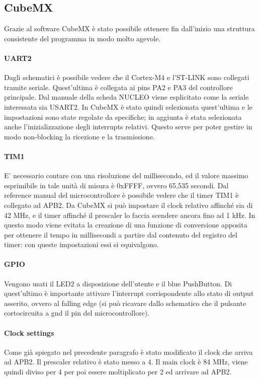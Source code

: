 \documentclass[a4paper]{article}
\begin{document}
	\subsection{CubeMX}
		Grazie al software CubeMX è stato possibile ottenere fin dall'inizio una struttura consistente del programma in modo molto agevole. 
		\paragraph{UART2} Dagli schematici è possibile vedere che il Cortex-M4 e l'ST-LINK sono collegati tramite seriale. Quest'ultima è collegata ai pins PA2 e PA3 del controllore principale. Dal manuale della scheda NUCLEO viene esplicitato come la seriale interessata sia USART2.
		In CubeMX è stato quindi selezionata quest'ultima e le impostazioni sono state regolate da specifiche; in aggiunta è stata selezionata anche l'inizializzazione degli interrupts relativi. Questo serve per poter gestire in modo non-blocking la ricezione e la trasmissione.
		\paragraph{TIM1} E' necessario contare con una risoluzione del millisecondo, ed il valore massimo esprimibile in tale unità di misura è 0xFFFF, ovvero 65,535 secondi. 
		Dal reference manual del microcontrollore è possibile vedere che il timer TIM1 è collegato ad APB2. Da CubeMX si può impostare il clock relativo affinché sia di 42 MHz, e il timer affinché il prescaler lo faccia scendere ancora fino ad 1 kHz. In questo modo viene evitata la creazione di una funzione di conversione apposita per ottenere il tempo in millisecondi a partire dal contenuto del registro del timer: con queste impostazioni essi si equivalgono.
		\paragraph{GPIO} Vengono usati il LED2 a disposizione dell'utente e il blue PushButton. Di quest'ultimo è importante attivare l'interrupt corrispondente allo stato di output asserito, ovvero al falling edge (si può ricavare dallo schematico che il pulsante cortocircuita a gnd il pin del microcontrollore).
		\paragraph{Clock settings}
		Come già spiegato nel precedente paragrafo è stato modificato il clock che arriva ad APB2. Il prescaler relativo è stato messo a 4. Il main clock è 84 MHz, viene quindi diviso per 4 per poi essere moltiplicato per 2 ed arrivare ad APB2.
\end{document}

